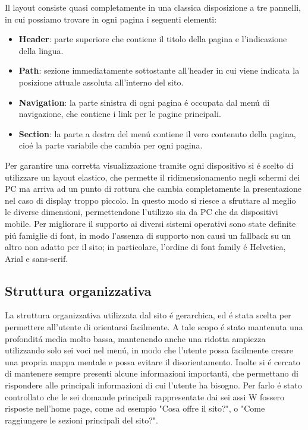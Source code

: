 \documentclass[10pt,a4paper,onecolumn]{article}
\begin{document}
Il layout consiste quasi completamente in una classica disposizione a tre pannelli, in cui possiamo trovare in ogni pagina i seguenti elementi:
\begin{itemize}
 \item \textbf{Header}: parte superiore che contiene il titolo della pagina e l'indicazione della lingua.
 \item \textbf{Path}: sezione immediatamente sottostante all'header in cui viene indicata la posizione attuale assoluta all'interno del sito.
 \item \textbf{Navigation}: la parte sinistra di ogni pagina \'e occupata dal men\'u di navigazione, che contiene i link per le pagine principali.
 \item \textbf{Section}: la parte a destra del men\'u contiene il vero contenuto della pagina, cio\'e la parte variabile che cambia per ogni pagina.
\end{itemize}
Per garantire una corretta visualizzazione tramite ogni dispositivo si \'e scelto di utilizzare un layout elastico, che permette il ridimensionamento negli schermi dei PC ma arriva ad un punto di rottura che cambia completamente la presentazione nel caso di display troppo piccolo. In questo modo si riesce a sfruttare al meglio le diverse dimensioni, permettendone l'utilizzo sia da PC che da dispositivi mobile.
Per migliorare il supporto ai diversi sistemi operativi sono state definite pi\'u famiglie di font, in modo l'assenza di supporto non causi un fallback su un altro non adatto per il sito; in particolare, l'ordine di font family \'e Helvetica, Arial e sans-serif.


\subsection{Struttura organizzativa}

La struttura organizzativa utilizzata dal sito \'e gerarchica, ed \'e stata scelta per permettere all'utente di orientarsi facilmente. A tale scopo \'e stato mantenuta una profondit\'a media molto bassa, mantenendo anche una ridotta ampiezza utilizzando solo sei voci nel men\'u, in modo che l'utente possa facilmente creare una propria mappa mentale e possa evitare il disorientamento.
Inolte si \'e cercato di mantenere sempre presenti alcune informazioni importanti, che permettano di rispondere alle principali informazioni di cui l'utente ha bisogno. Per farlo \'e stato controllato che le sei domande principali rappresentate dai sei assi W fossero risposte nell'home page, come ad esempio "Cosa offre il sito?", o "Come raggiungere le sezioni principali del sito?".
\end{document}
